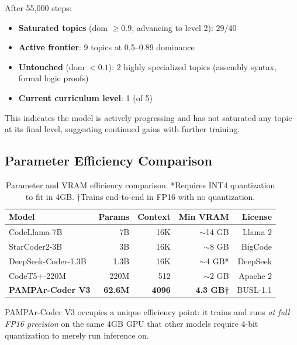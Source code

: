 \documentclass[11pt,a4paper]{article}
\begin{document}
After 55,000 steps:

\begin{itemize}
    \item \textbf{Saturated topics} (dom $\geq 0.9$, advancing to level 2): 29/40
    \item \textbf{Active frontier}: 9 topics at 0.5--0.89 dominance
    \item \textbf{Untouched} (dom $< 0.1$): 2 highly specialized topics
    (assembly syntax, formal logic proofs)
    \item \textbf{Current curriculum level}: 1 (of 5)
\end{itemize}

This indicates the model is actively progressing and has not saturated any
topic at its final level, suggesting continued gains with further training.

\subsection{Parameter Efficiency Comparison}

\begin{table}[h]
\centering
\begin{tabular}{lrrrr}
\toprule
\textbf{Model} & \textbf{Params} & \textbf{Context} & \textbf{Min VRAM} & \textbf{License} \\
\midrule
CodeLlama-7B        & 7B    & 16K  & $\sim$14 GB  & Llama 2 \\
StarCoder2-3B       & 3B    & 16K  & $\sim$8 GB   & BigCode \\
DeepSeek-Coder-1.3B & 1.3B  & 16K  & $\sim$4 GB*  & DeepSeek \\
CodeT5+-220M        & 220M  & 512  & $\sim$2 GB   & Apache 2 \\
\midrule
\textbf{PAMPAr-Coder V3} & \textbf{62.6M} & \textbf{4096} & \textbf{4.3 GB†} & BUSL-1.1 \\
\bottomrule
\end{tabular}
\caption{Parameter and VRAM efficiency comparison.
*Requires INT4 quantization to fit in 4GB.
†Trains end-to-end in FP16 with no quantization.}
\label{tab:comparison}
\end{table}

PAMPAr-Coder V3 occupies a unique efficiency point: it trains and runs
\emph{at full FP16 precision} on the same 4GB GPU that other models require
4-bit quantization to merely run inference on.

\end{document}
